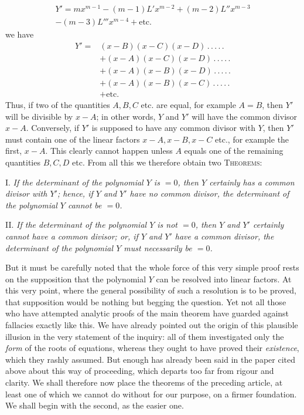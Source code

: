 \[
\begin{gathered}Y'=mx^{m-1}-(m-1)L'x^{m-2}+(m-2)L''x^{m-3}\\-(m-3)L'''x^{m-4}+\text{etc.}\end{gathered}
\]
we have
\[
\begin{aligned}
Y'={}&(x-B)(x-C)(x-D)\, .\, .\, .\, .\, .\\
&+(x-A)(x-C)(x-D)\, .\, .\, .\, .\, .\\
&+(x-A)(x-B)(x-D)\, .\, .\, .\, .\, .\\
&+(x-A)(x-B)(x-C)\, .\, .\, .\, .\, .\\
&+\text{etc.}
\end{aligned}
\]
Thus, if two of the quantities $A,B,C$ etc. are equal, for example $A=B$, then $Y'$ will be divisible by $x-A$; in other words, $Y$ and $Y'$ will have the common divisor $x-A$. Conversely, if $Y'$ is supposed to have any common divisor with $Y$, then $Y'$ must contain one of the linear factors $x-A,x-B,x-C$ etc., for example the first, $x-A$. This clearly cannot happen unless $A$ equals one of the remaining quantities $B,C,D$ etc. From all this we therefore obtain two \textsc{Theorems}:

I. \textit{If the determinant of the polynomial $Y$ is $=0$, then $Y$ certainly has a common divisor with $Y'$; hence, if $Y$ and $Y'$ have no common divisor, the determinant of the polynomial $Y$ cannot be $=0$.}

II. \textit{If the determinant of the polynomial $Y$ is not $=0$, then $Y$ and $Y'$ certainly cannot have a common divisor; or, if $Y$ and $Y'$ have a common divisor, the determinant of the polynomial $Y$ must necessarily be $=0$.}

But it must be carefully noted that the whole force of this very simple proof rests on the supposition that the polynomial $Y$ can be resolved into linear factors. At this very point, where the general possibility of such a resolution is to be proved, that supposition would be nothing but begging the question. Yet not all those who have attempted analytic proofs of the main theorem have guarded against fallacies exactly like this. We have already pointed out the origin of this plausible illusion in the very statement of the inquiry: all of them investigated only the \textit{form} of the roots of equations, whereas they ought to have proved their \textit{existence}, which they rashly assumed. But enough has already been said in the paper cited above about this way of proceeding, which departs too far from rigour and clarity. We shall therefore now place the theorems of the preceding article,
at least one of which we cannot do without for our purpose, on a firmer foundation. We shall begin with the second, as the easier one.


